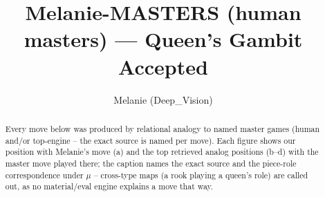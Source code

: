 \documentclass[11pt]{article}
\title{Melanie-MASTERS (human masters) — Queen's Gambit Accepted}
\author{Melanie (Deep\_Vision)}
\date{}
\begin{document}
\maketitle

\begin{abstract}Every move below was produced by relational analogy to named master games (human and/or top-engine -- the exact source is named per move). Each figure shows our position with Melanie's move (a) and the top retrieved analog positions (b--d) with the master move played there; the caption names the exact source and the piece-role correspondence under $\mu$ -- cross-type maps (a rook playing a queen's role) are called out, as no material/eval engine explains a move that way.\end{abstract}

\begin{figure}[p]\centering
\begin{subfigure}{0.46\textwidth}\centering
\resizebox{\linewidth}{!}{%
\newchessgame
\chessboard[
  setfen={rnbqkb1r/1p3ppp/p3pn2/2p5/P1BP4/4PN2/1P3PPP/RNBQ1RK1 b kq - 0 7},
  showmover=false,
  pgfstyle=straightmove, color=movearrow, markmove={c8-d7}
]}
\caption{}
\end{subfigure}\hfill
\begin{subfigure}{0.46\textwidth}\centering
\resizebox{\linewidth}{!}{%
\newchessgame
\chessboard[
  setfen={rn1qkb1r/1b3ppp/p3pn2/1p6/P2P4/1B2PN2/5PPP/RNBQ1RK1 b kq - 0 11},
  showmover=false,
  pgfstyle=straightmove, color=movearrow, markmove={b8-d7}
]}
\caption{}
\end{subfigure}
\\[4pt]
\begin{subfigure}{0.46\textwidth}\centering
\resizebox{\linewidth}{!}{%
\newchessgame
\chessboard[
  setfen={rn2kb1r/pbq2ppp/1p1ppn2/8/2PB4/1P3NP1/P3QPBP/RN3RK1 b kq - 0 11},
  showmover=false,
  pgfstyle=straightmove, color=movearrow, markmove={b8-d7}
]}
\caption{}
\end{subfigure}\hfill
\begin{subfigure}{0.46\textwidth}\centering
\resizebox{\linewidth}{!}{%
\newchessgame
\chessboard[
  setfen={rn1qkb1r/1b3ppp/p3pn2/1p6/P2P4/1p1BPN2/5PPP/RNBQ1RK1 b kq - 1 11},
  showmover=false,
  pgfstyle=straightmove, color=movearrow, markmove={b5-a4}
]}
\caption{}
\end{subfigure}

\end{figure}
\end{document}
